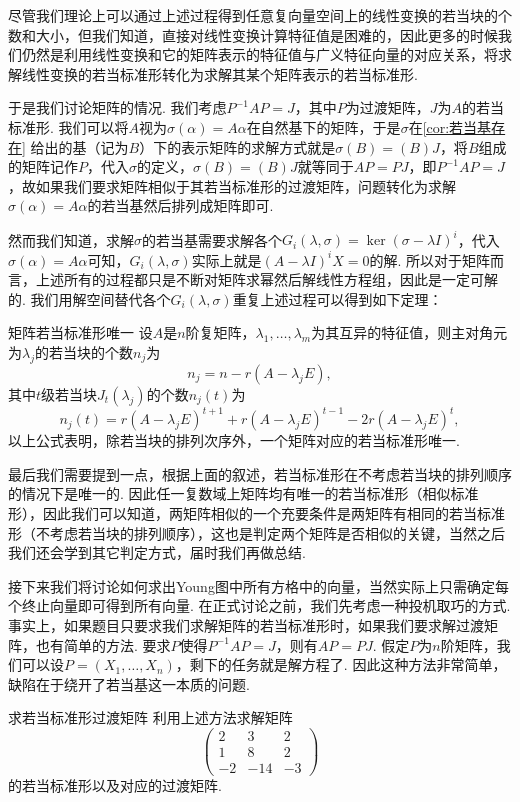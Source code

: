 尽管我们理论上可以通过上述过程得到任意复向量空间上的线性变换的若当块的个数和大小，但我们知道，直接对线性变换计算特征值是困难的，因此更多的时候我们仍然是利用线性变换和它的矩阵表示的特征值与广义特征向量的对应关系，将求解线性变换的若当标准形转化为求解其某个矩阵表示的若当标准形.

于是我们讨论矩阵的情况. 我们考虑$P^{-1}AP=J$，其中$P$为过渡矩阵，$J$为$A$的若当标准形. 我们可以将$A$视为$\sigma(\alpha)=A\alpha$在自然基下的矩阵，于是$\sigma$在\autoref{cor:若当基存在} 给出的基（记为$B$）下的表示矩阵的求解方式就是$\sigma(B)=(B)J$，将$B$组成的矩阵记作$P$，代入$\sigma$的定义，$\sigma(B)=(B)J$就等同于$AP=PJ$，即$P^{-1}AP=J$，故如果我们要求矩阵相似于其若当标准形的过渡矩阵，问题转化为求解$\sigma(\alpha)=A\alpha$的若当基然后排列成矩阵即可.

然而我们知道，求解$\sigma$的若当基需要求解各个$G_i(\lambda,\sigma)=\ker(\sigma-\lambda I)^i$，代入$\sigma(\alpha)=A\alpha$可知，$G_i(\lambda,\sigma)$实际上就是$(A-\lambda I)^iX=0$的解. 所以对于矩阵而言，上述所有的过程都只是不断对矩阵求幂然后解线性方程组，因此是一定可解的. 我们用解空间替代各个$G_i(\lambda,\sigma)$重复上述过程可以得到如下定理：
\begin{theorem}{}{矩阵若当标准形唯一}
    设$A$是$n$阶复矩阵，$\lambda_1,\ldots,\lambda_m$为其互异的特征值，则主对角元为$\lambda_j$的若当块的个数$n_j$为
    \begin{equation} \label{eq:17:矩阵若当块个数}
        n_j=n-r(A-\lambda_j E),
    \end{equation}
    其中$t$级若当块$J_t(\lambda_j)$的个数$n_j(t)$为
    \begin{equation} \label{eq:17:矩阵若当块大小}
        n_j(t)=r(A-\lambda_j E)^{t+1}+r(A-\lambda_j E)^{t-1}-2r(A-\lambda_j E)^t,
    \end{equation}
    以上公式表明，除若当块的排列次序外，一个矩阵对应的若当标准形唯一.
\end{theorem}

最后我们需要提到一点，根据上面的叙述，若当标准形在不考虑若当块的排列顺序的情况下是唯一的. 因此任一复数域上矩阵均有唯一的若当标准形（相似标准形），因此我们可以知道，两矩阵相似的一个充要条件是两矩阵有相同的若当标准形（不考虑若当块的排列顺序），这也是判定两个矩阵是否相似的关键，当然之后我们还会学到其它判定方式，届时我们再做总结.

接下来我们将讨论如何求出Young图中所有方格中的向量，当然实际上只需确定每个终止向量即可得到所有向量. 在正式讨论之前，我们先考虑一种投机取巧的方式. 事实上，如果题目只要求我们求解矩阵的若当标准形时，如果我们要求解过渡矩阵，也有简单的方法. 要求$P$使得$P^{-1}AP=J$，则有$AP=PJ$. 假定$P$为$n$阶矩阵，我们可以设$P=(X_1,\ldots,X_n)$，剩下的任务就是解方程了. 因此这种方法非常简单，缺陷在于绕开了若当基这一本质的问题.
\begin{example}{}{求若当标准形过渡矩阵}
    利用上述方法求解矩阵\[\begin{pmatrix}
            2 & 3 & 2 \\ 1 & 8 & 2 \\ -2 & -14 & -3
        \end{pmatrix}\]的若当标准形以及对应的过渡矩阵.
\end{example}

